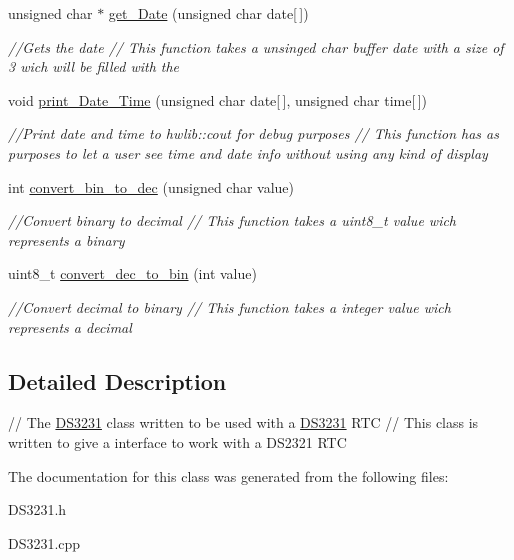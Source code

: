 \begin{DoxyCompactItemize}
unsigned char $\ast$ \hyperlink{classDS3231_a3f239b6d1a7caea0d5968e96d4d01c33}{get\+\_\+\+Date} (unsigned char date\mbox{[}$\,$\mbox{]})
\begin{DoxyCompactList}\small\item\em //\+Gets the date  // This function takes a unsinged char buffer date with a size of 3 wich will be filled with the \end{DoxyCompactList}\item 
\mbox{\label{classDS3231_aeab337c5de40bcebaf6aa3e856d43e69}} 
void \hyperlink{classDS3231_aeab337c5de40bcebaf6aa3e856d43e69}{print\+\_\+\+Date\+\_\+\+Time} (unsigned char date\mbox{[}$\,$\mbox{]}, unsigned char time\mbox{[}$\,$\mbox{]})
\begin{DoxyCompactList}\small\item\em //\+Print date and time to hwlib\+::cout for debug purposes  // This function has as purposes to let a user see time and date info without using any kind of display \end{DoxyCompactList}\item 
\mbox{\label{classDS3231_a505df2184898f9773d41ae8fde8e647a}} 
int \hyperlink{classDS3231_a505df2184898f9773d41ae8fde8e647a}{convert\+\_\+bin\+\_\+to\+\_\+dec} (unsigned char value)
\begin{DoxyCompactList}\small\item\em //\+Convert binary to decimal  // This function takes a uint8\+\_\+t value wich represents a binary \end{DoxyCompactList}\item 
\mbox{\label{classDS3231_adbe3aa8366cf09b1ec1f7d0e4aa826db}} 
uint8\+\_\+t \hyperlink{classDS3231_adbe3aa8366cf09b1ec1f7d0e4aa826db}{convert\+\_\+dec\+\_\+to\+\_\+bin} (int value)
\begin{DoxyCompactList}\small\item\em //\+Convert decimal to binary  // This function takes a integer value wich represents a decimal \end{DoxyCompactList}\end{DoxyCompactItemize}


\subsection{Detailed Description}
// The \hyperlink{classDS3231}{D\+S3231} class written to be used with a \hyperlink{classDS3231}{D\+S3231} R\+TC  // This class is written to give a interface to work with a D\+S2321 R\+TC 

The documentation for this class was generated from the following files\+:\begin{DoxyCompactItemize}
\item 
D\+S3231.\+h\item 
D\+S3231.\+cpp\end{DoxyCompactItemize}
